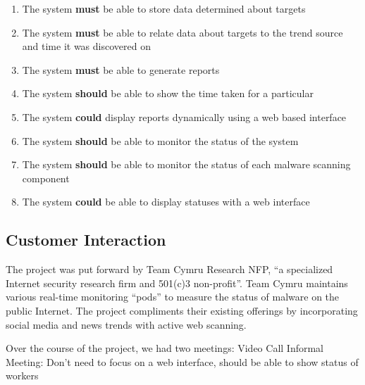 \begin{enumerate}
    \item The system \textbf{must} be able to store data determined about targets
    \item The system \textbf{must} be able to relate data about targets to the trend source and time it was discovered on
    \item The system \textbf{must} be able to generate reports
    \item The system \textbf{should} be able to show the time taken for a particular 
    \item The system \textbf{could} display reports dynamically using a web based interface
    \item The system \textbf{should} be able to monitor the status of the system
    \item The system \textbf{should} be able to monitor the status of each malware scanning component
    \item The system \textbf{could} be able to display statuses with a web interface
\end{enumerate}

\subsection{Customer Interaction}
The project was put forward by Team Cymru Research NFP, ``a specialized Internet security research firm and 501(c)3 non-profit''\cite{team-cymru}. Team Cymru maintains various real-time monitoring ``pods'' to measure the status of malware on the public Internet.  The project compliments their existing offerings by incorporating social media and news trends with active web scanning.

Over the course of the project, we had two meetings:
    Video Call
    Informal Meeting: Don't need to focus on a web interface, should be able to show status of workers

